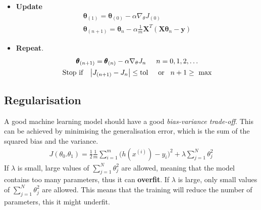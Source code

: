 \documentclass[a4paper,10pt]{article}
\begin{document}
\begin{itemize}
        \vspace*{-0.4cm}
    \item \textbf{Update}
        \begin{gather*}
            \pmb{\theta}_{(1)} = \pmb{\theta}_{(0)} - \alpha\nabla_\theta J_{(0)}\\
            \pmb{\theta}_{(n+1)} = \pmb{\theta}_n - \alpha\frac{1}{m}\mathbf{X}^T(\mathbf{X}\pmb{\theta}_n-\pmb{y})
        \end{gather*}
    \item \textbf{Repeat}.
        \begin{gather*}
            \pmb{\theta}_{(n+1)} = \pmb{\theta}_{(n)} - \alpha\nabla_\theta J_{n}\hspace*{0.5cm}n = 0,1,2,\dots\\
            \text{Stop if}\hspace*{0.3cm}\left| J_{(n+1)}-J_n \right|\leq\text{tol}\hspace*{0.5cm}\text{or}\hspace*{0.3cm}n+1\geq\text{ max}
        \end{gather*}
\end{itemize}

\subsection{Regularisation}
A good machine learning model should have a good \textit{bias-variance trade-off}. This can be achieved by minimising the generalisation error, which is the sum of the squared bias and the variance. 
\begin{gather*}
    J(\theta_0. \theta_1) = \frac{1}{2}\frac{1}{m}\sum_{i=1}^{m}\Big(h(x^{(i)})-y_i\Big)^2 + \lambda\sum_{j=1}^{N}\theta_j^2
\end{gather*}
If $\lambda$ is small, large values of $\sum_{j=1}^{N}\theta_j^2$ are allowed, meaning that the model contains too many parameters, thus it can \textbf{overfit}. If $\lambda$ is large, only small values of $\sum_{j=1}^{N}\theta_j^2$ are allowed. This means that the training will reduce the number of parameters, this it might underfit. 
\end{document}
